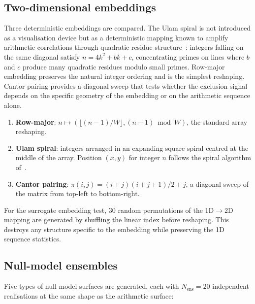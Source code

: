\documentclass[final,1p,times]{elsarticle}
\theoremstyle{definition}
\begin{document}
\subsection{Two-dimensional embeddings}

Three deterministic embeddings are compared. The Ulam spiral is
not introduced as a visualisation device but as a deterministic
mapping known to amplify arithmetic correlations through quadratic
residue structure~\cite{ULAM-SPIRAL-1963}: integers falling on the
same diagonal satisfy $n = 4k^2 + bk + c$, concentrating primes on
lines where $b$ and $c$ produce many quadratic residues modulo small
primes. Row-major embedding preserves the natural integer ordering
and is the simplest reshaping. Cantor pairing provides a diagonal
sweep that tests whether the exclusion signal depends on the
specific geometry of the embedding or on the arithmetic sequence
alone.
\begin{enumerate}
  \item \textbf{Row-major}: $n \mapsto (\lfloor (n-1)/W \rfloor,
        (n-1) \bmod W)$, the standard array reshaping.
  \item \textbf{Ulam spiral}: integers arranged in an expanding square
        spiral centred at the middle of the array. Position $(x,y)$ for
        integer $n$ follows the spiral algorithm of~\cite{ULAM-SPIRAL-1963}.
  \item \textbf{Cantor pairing}:
        $\pi(i,j) = (i+j)(i+j+1)/2 + j$, a diagonal sweep of the
        matrix from top-left to bottom-right.
\end{enumerate}

For the surrogate embedding test, 30 random permutations of the
1D$\to$2D mapping are generated by shuffling the linear index before
reshaping. This destroys any structure specific to the embedding while
preserving the 1D sequence statistics.

\subsection{Null-model ensembles}

Five types of null-model surfaces are generated, each with
$N_{\text{ens}} = 20$ independent realisations at the same shape as
the arithmetic surface:
\end{document}
